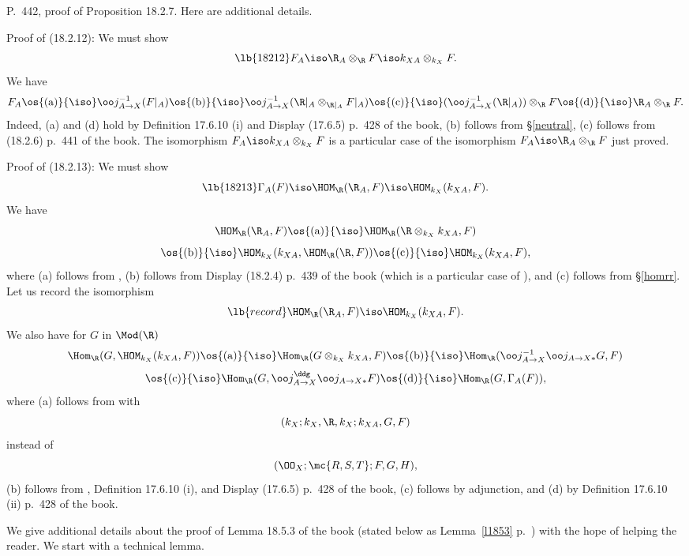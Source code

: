 \documentclass[12pt]{article}
\theoremstyle{remark}
\theoremstyle{definition}
\begin{document}
\begin{s}
P.~442, proof of Proposition 18.2.7. Here are additional details. 

Proof of (18.2.12): We must show 
\begin{equation}\lb{18212}
F_A\iso\R_A\otimes_\R F\iso k_{XA}\otimes_{k_X}F. 
\end{equation} 
We have 
$$
F_A\os{(\text a)}{\iso}
\oo j_{A\to X}^{-1}(F|_A)\os{(\text b)}{\iso}
\oo j_{A\to X}^{-1}(\R|_A\otimes_{\R|_A}F|_A)\os{(\text c)}{\iso}
(\oo j_{A\to X}^{-1}(\R|_A))\otimes_\R F\os{(\text d)}{\iso} 
\R_A\otimes_\R F.
$$ 
Indeed, (a) and (d) hold by Definition 17.6.10 (i) and Display (17.6.5) p.~428 of the book, (b) follows from \S\ref{neutral}, (c) follows from (18.2.6) p.~441 of the book. The isomorphism $F_A\iso k_{XA}\otimes_{k_X}F$ is a particular case of the isomorphism $F_A\iso\R_A\otimes_\R F$ just proved. 

Proof of (18.2.13): We must show 
\begin{equation}\lb{18213} 
\Gamma_A(F)\iso\HOM_\R(\R_A,F)\iso\HOM_{k_X}(k_{XA},F). 
\end{equation}
We have 
$$
\HOM_\R(\R_A,F)\os{(\text a)}{\iso}
\HOM_\R(\R\otimes_{k_X}k_{XA},F)
$$
$$
\os{(\text b)}{\iso}
\HOM_{k_X}(k_{XA},\HOM_\R(\R,F))\os{(\text c)}{\iso}
\HOM_{k_X}(k_{XA},F), 
$$ 
where (a) follows from , (b) follows from Display (18.2.4) p.~439 of the book (which is a particular case of ), and (c) follows from \S\ref{homrr}. Let us record the isomorphism 
%
\begin{equation}\lb{record}
\HOM_\R(\R_A,F)\iso\HOM_{k_X}(k_{XA},F). 
\end{equation} 
%
We also have for $G$ in $\Mod(\R)$ 
$$
\Hom_\R(G,\HOM_{k_X}(k_{XA},F))\os{(\text a)}{\iso}
\Hom_\R(G\otimes_{k_X}k_{XA},F)\os{(\text b)}{\iso}
\Hom_\R(\oo j_{A\to X}^{-1}\oo j_{A\to X*}G,F)
$$
$$
\os{(\text c)}{\iso}
\Hom_\R(G,\oo j_{A\to X}^\ddg\oo j_{A\to X*}F)\os{(\text d)}{\iso}
\Hom_\R(G,\Gamma_A(F)), 
$$ 
where (a) follows from  with 
$$
(k_X;k_X,\R,k_X;k_{XA},G,F)
$$ 
instead of 
$$
(\OO_X;\mc{R,S,T};F,G,H),
$$ 
(b) follows from , Definition 17.6.10 (i), and Display (17.6.5) p.~428 of the book, (c) follows by adjunction, and (d) by Definition 17.6.10 (ii) p.~428 of the book. 
\end{s} 



We give additional details about the proof of Lemma 18.5.3 of the book (stated below as Lemma~\ref{l1853} p.~) with the hope of helping the reader. We start with a technical lemma.
\end{document}
